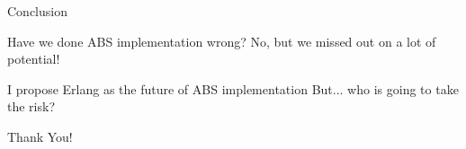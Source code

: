 \documentclass{beamer} %
\begin{document}
\begin{frame}{Conclusion}
\begin{block}{Have we done ABS implementation wrong?}
No, but we missed out on a lot of potential!
\end{block}

\begin{block}{I propose Erlang as the future of ABS implementation}
But... who is going to take the risk?
\end{block}
\end{frame}

\begin{frame}{}
  \begin{center}
  Thank You!
  \end{center}
\end{frame}



\end{document}
